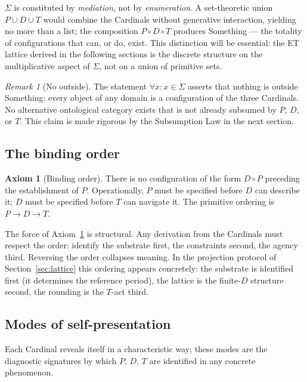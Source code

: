 \documentclass[11pt,a4paper]{article}
\theoremstyle{definition}
\newtheorem{axiom}[theorem]{Axiom}
\theoremstyle{remark}
\newtheorem{remark}[theorem]{Remark}
\begin{document}
$\Sigma$ is constituted by \emph{mediation}, not by \emph{enumeration}. A set-theoretic union $P \cup D \cup T$ would combine the Cardinals without generative interaction, yielding no more than a list; the composition $P \circ D \circ T$ produces Something --- the totality of configurations that can, or do, exist. This distinction will be essential: the ET lattice derived in the following sections is the discrete structure on the multiplicative aspect of $\Sigma$, not on a union of primitive sets.

\begin{remark}[No outside]
The statement $\forall x : x \in \Sigma$ asserts that nothing is outside Something: every object of any domain is a configuration of the three Cardinals. No alternative ontological category exists that is not already subsumed by $P$, $D$, or $T$. This claim is made rigorous by the Subsumption Law in the next section.
\end{remark}

\subsection{The binding order}

\begin{axiom}[Binding order]\label{ax:order}
There is no configuration of the form $D \circ P$ preceding the establishment of $P$. Operationally, $P$ must be specified before $D$ can describe it; $D$ must be specified before $T$ can navigate it. The primitive ordering is $P \to D \to T$.
\end{axiom}

The force of Axiom~\ref{ax:order} is structural. Any derivation from the Cardinals must respect the order: identify the substrate first, the constraints second, the agency third. Reversing the order collapses meaning. In the projection protocol of Section~\ref{sec:lattice} this ordering appears concretely: the substrate is identified first (it determines the reference period), the lattice is the finite-$D$ structure second, the rounding is the $T$-act third.

\subsection{Modes of self-presentation}

Each Cardinal reveals itself in a characteristic way; these modes are the diagnostic signatures by which $P$, $D$, $T$ are identified in any concrete phenomenon.
\end{document}
